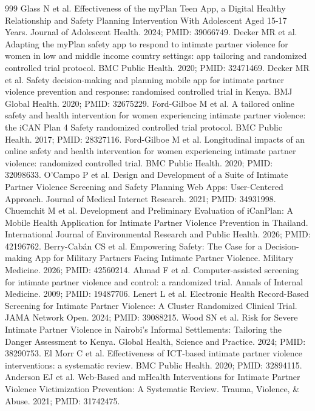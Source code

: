 \begin{thebibliography}{999}
 Glass N et al. Effectiveness of the myPlan Teen App, a Digital Healthy Relationship and Safety Planning Intervention With Adolescent Aged 15-17 Years. Journal of Adolescent Health. 2024; PMID: 39066749.
 Decker MR et al. Adapting the myPlan safety app to respond to intimate partner violence for women in low and middle income country settings: app tailoring and randomized controlled trial protocol. BMC Public Health. 2020; PMID: 32471469.
 Decker MR et al. Safety decision-making and planning mobile app for intimate partner violence prevention and response: randomised controlled trial in Kenya. BMJ Global Health. 2020; PMID: 32675229.
 Ford-Gilboe M et al. A tailored online safety and health intervention for women experiencing intimate partner violence: the iCAN Plan 4 Safety randomized controlled trial protocol. BMC Public Health. 2017; PMID: 28327116.
 Ford-Gilboe M et al. Longitudinal impacts of an online safety and health intervention for women experiencing intimate partner violence: randomized controlled trial. BMC Public Health. 2020; PMID: 32098633.
 O'Campo P et al. Design and Development of a Suite of Intimate Partner Violence Screening and Safety Planning Web Apps: User-Centered Approach. Journal of Medical Internet Research. 2021; PMID: 34931998.
 Chuemchit M et al. Development and Preliminary Evaluation of iCanPlan: A Mobile Health Application for Intimate Partner Violence Prevention in Thailand. International Journal of Environmental Research and Public Health. 2026; PMID: 42196762.
 Berry-Cabán CS et al. Empowering Safety: The Case for a Decision-making App for Military Partners Facing Intimate Partner Violence. Military Medicine. 2026; PMID: 42560214.
 Ahmad F et al. Computer-assisted screening for intimate partner violence and control: a randomized trial. Annals of Internal Medicine. 2009; PMID: 19487706.
 Lenert L et al. Electronic Health Record-Based Screening for Intimate Partner Violence: A Cluster Randomized Clinical Trial. JAMA Network Open. 2024; PMID: 39088215.
 Wood SN et al. Risk for Severe Intimate Partner Violence in Nairobi's Informal Settlements: Tailoring the Danger Assessment to Kenya. Global Health, Science and Practice. 2024; PMID: 38290753.
 El Morr C et al. Effectiveness of ICT-based intimate partner violence interventions: a systematic review. BMC Public Health. 2020; PMID: 32894115.
 Anderson EJ et al. Web-Based and mHealth Interventions for Intimate Partner Violence Victimization Prevention: A Systematic Review. Trauma, Violence, \& Abuse. 2021; PMID: 31742475.

\end{thebibliography}
